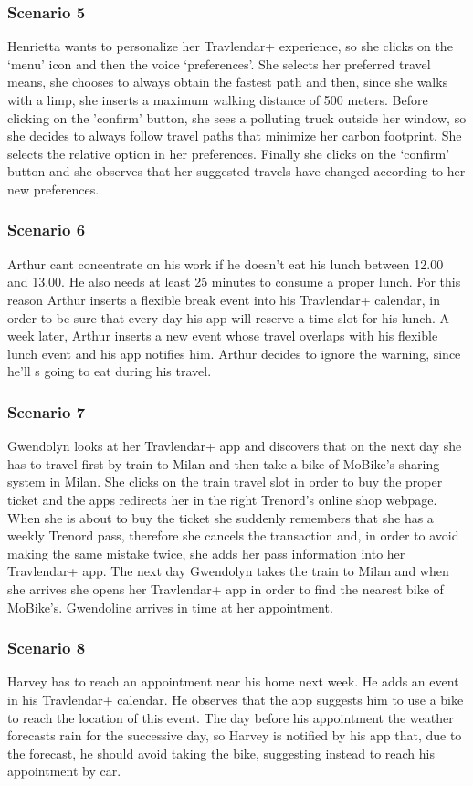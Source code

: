 	\subsubsection{Scenario 5}
		Henrietta wants to personalize her Travlendar+ experience, so she clicks on the ‘menu’ icon and then the voice ‘preferences’. She selects her preferred travel means, she chooses to always obtain the fastest path and then, since she walks with a limp, she inserts a maximum walking distance of 500 meters. Before clicking on the 'confirm' button, she sees a polluting truck outside her window, so she decides to always follow travel paths that minimize her carbon footprint. She selects the relative option in her preferences. Finally she clicks on the ‘confirm’ button and she observes that her suggested travels have changed according to her new preferences.
	\subsubsection{Scenario 6}
		Arthur can\textsc{}t concentrate on his work if he doesn't eat his lunch between 12.00 and 13.00. He also needs at least 25 minutes to consume a proper lunch.
For this reason Arthur inserts a flexible break event into his Travlendar+ calendar, in order to be sure that every day his app will reserve a time slot for his lunch.
A week later, Arthur inserts a new event whose travel overlaps with his flexible lunch event and his app notifies him. Arthur decides to ignore the warning, since he'll s going to eat during his travel.
	\subsubsection{Scenario 7}
		Gwendolyn looks at her Travlendar+ app and discovers that on the next day she has to travel first by train to Milan and then take a bike of MoBike’s sharing system in Milan. She clicks on the train travel slot in order to buy the proper ticket and the apps redirects her in the right Trenord’s online shop webpage. When she is about to buy the ticket she suddenly remembers that she has a weekly Trenord pass, therefore she cancels the transaction and, in order to avoid making the same mistake twice, she adds her pass information into her Travlendar+ app. The next day Gwendolyn takes the train to Milan and when she arrives she opens her Travlendar+ app in order to find the nearest bike of MoBike’s. Gwendoline arrives in time at her appointment.
	\subsubsection{Scenario 8}
		Harvey has to reach an appointment near his home next week. He adds an event in his Travlendar+ calendar. He observes that the app suggests him to use a bike to reach the location of this event. The day before his appointment the weather forecasts rain for the successive day, so Harvey is notified by his app that, due to the forecast, he should avoid taking the bike, suggesting instead to reach his appointment by car.
